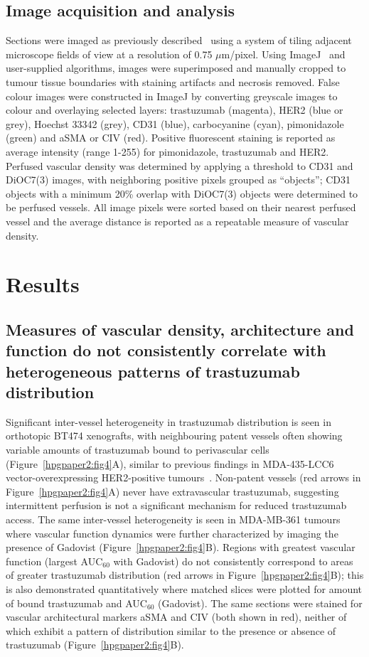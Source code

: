 \subsection{Image acquisition and analysis}
Sections were imaged as previously described~\cite{Kyle:2007ch} using a system of tiling adjacent microscope fields of view at a resolution of 0.75 $\mu$m/pixel.
Using ImageJ~\cite{Collins:2007jr} and user-supplied algorithms, images were superimposed and manually cropped to tumour tissue boundaries with staining artifacts and necrosis removed.
False colour images were constructed in ImageJ by converting greyscale images to colour and overlaying selected layers: trastuzumab (magenta), \acs{HER2} (blue or grey), Hoechst 33342 (grey), CD31 (blue), carbocyanine (cyan), pimonidazole (green) and \acs{aSMA} or \acs{CIV} (red).
Positive fluorescent staining is reported as average intensity (range 1-255) for pimonidazole, trastuzumab and \acs{HER2}.
Perfused vascular density was determined by applying a threshold to CD31 and DiOC7(3) images, with neighboring positive pixels grouped as ``objects''; CD31 objects with a minimum 20\% overlap with DiOC7(3) objects were determined to be perfused vessels.
All image pixels were sorted based on their nearest perfused vessel and the average distance is reported as a repeatable measure of vascular density.

\section{Results}

\subsection{Measures of vascular density, architecture and function do not consistently correlate with heterogeneous patterns of trastuzumab distribution}

Significant inter-vessel heterogeneity in trastuzumab distribution is seen in orthotopic \acs{BT474} xenografts, with neighbouring patent vessels often showing variable amounts of trastuzumab bound to perivascular cells (Figure~\ref{hpgpaper2:fig4}A), similar to previous findings in MDA-435-LCC6 vector-overexpressing \acs{HER2}-positive tumours~\cite{Baker:2008ci}.
Non-patent vessels (red arrows in Figure~\ref{hpgpaper2:fig4}A) never have extravascular trastuzumab, suggesting intermittent perfusion is not a significant mechanism for reduced trastuzumab access.
The same inter-vessel heterogeneity is seen in \acs{MDA-MB-361} tumours where vascular function dynamics were further characterized by imaging the presence of Gadovist (Figure~\ref{hpgpaper2:fig4}B).
Regions with greatest vascular function (largest \acs{AUC}$_{60}$ with Gadovist) do not consistently correspond to areas of greater trastuzumab distribution (red arrows in Figure~\ref{hpgpaper2:fig4}B); this is also demonstrated quantitatively where matched slices were plotted for amount of bound trastuzumab and \acs{AUC}$_{60}$ (Gadovist).
The same sections were stained for vascular architectural markers \acs{aSMA} and \acs{CIV} (both shown in red), neither of which exhibit a pattern of distribution similar to the presence or absence of trastuzumab (Figure~\ref{hpgpaper2:fig4}B).

